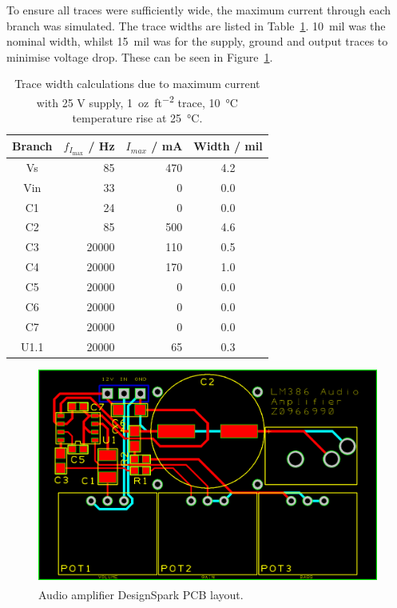\documentclass[a4paper,10pt]{article}
\newcommand{\DesignSparkPcb}{DesignSpark
	PCB\textsuperscript{\textregistered}\xspace}
\begin{document}

To ensure all traces were sufficiently wide, the maximum current through each
branch was simulated. The trace widths are listed in
Table~\ref{tab:width}. \SI{10}{mil} was the nominal width, whilst
\SI{15}{mil} was for the supply, ground and output traces to minimise voltage
drop. These can be seen in Figure~\ref{fig:pcb}.

\begin{table}[h]
	\centering
	\caption{Trace width calculations due to maximum current with 25 V
		     supply, \SI{1}{oz\per ft^2} trace, \SI{10}{\celsius} temperature
		     rise at \SI{25}{\celsius}.}
    \label{tab:width}
    \begin{footnotesize}
	\begin{tabular}{@{}crrc@{}}
	\toprule
	Branch &
	{$f_{I_{\text{max}}}$ / \si{\hertz}} &
	{$I_{max}$ / \si{\milli\ampere}} &
	Width / mil \\
	\midrule
	Vs   &    85 & 470 & 4.2 \\
	Vin  &    33 &   0 & 0.0 \\
	C1   &    24 &   0 & 0.0 \\
	C2   &    85 & 500 & 4.6 \\ 
	C3   & 20000 & 110 & 0.5 \\
	C4   & 20000 & 170 & 1.0 \\
	C5   & 20000 &   0 & 0.0 \\
	C6   & 20000 &   0 & 0.0 \\
	C7   & 20000 &   0 & 0.0 \\
	U1.1 & 20000 &  65 & 0.3 \\
	\bottomrule
	\end{tabular}
    \end{footnotesize}
\end{table}

\begin{figure}
	\centering
	\includegraphics[width=\textwidth]{img/audio_amplifier_pcb.png}
	\caption{Audio amplifier \DesignSparkPcb layout.}
	\label{fig:pcb}
\end{figure}
\end{document}
